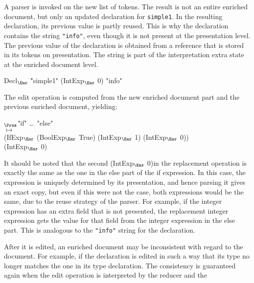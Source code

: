 A parser is invoked on the new list of tokens. The result is not an entire enriched document, but only an updated declaration for \verb|simple1|. In the resulting declaration, its previous value is partly reused. This is why the declaration contains the string \verb|"info"|, even though it is not present at the presentation level. The previous value of the declaration is obtained from a reference that is stored in its tokens on presentation. The string is part of the interpretation extra state at the enriched document level.

\small \ttfamily
\begin{tabbing}
Decl$_{\Enr}$ \= "simple1" (IntExp$_{\Enr}$ 0) "info"
\end{tabbing}
\rmfamily \normalsize

The edit operation is computed from the new enriched document part and the previous enriched document, yielding:

\small \ttfamily
\begin{tabbing}
$_{\Pres}$\ttfamily  "if" \dots~"else"\\
$\mapsto$\\
  \ttfamily (IfExp$_{\Enr}$ (BoolExp$_{\Enr}$ True) (IntExp$_{\Enr}$ 1) (IntExp$_{\Enr}$ 0))\\
  \ttfamily (IntExp$_{\Enr}$ 0) 
\end{tabbing}
\rmfamily \normalsize

It should be noted that the second \ttfamily (IntExp$_{\Enr}$ 0)\rmfamily in the replacement operation is exactly the same as the one in the else part of the if expression. In this case, the expression is uniquely determined by its presentation, and hence parsing it gives an exact copy, but even if this were not the case, both expressions would be the same, due to the reuse strategy of the parser. For example, if the integer expression has an extra field that is not presented, the replacement integer expression gets the value for that field from the integer expression in the else part. This is analogous to the \verb|"info"| string for the declaration.


\bc
After it is edited, an enriched document may be inconsistent with regard to the document. For example, if the declaration is edited in such a way that its type no longer matches the one in its type declaration. The consistency is guaranteed again when the edit operation is interpreted by the reducer and the 
\ec

